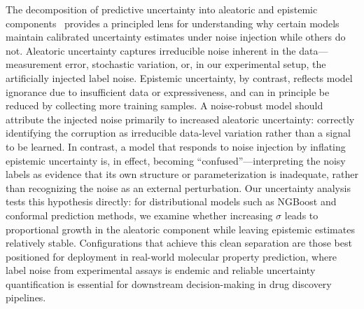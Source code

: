 The decomposition of predictive uncertainty into aleatoric and epistemic
components~\citep{kendall2017uncertainties} provides a principled lens for
understanding why certain models maintain calibrated uncertainty estimates under
noise injection while others do not. Aleatoric uncertainty captures irreducible
noise inherent in the data---measurement error, stochastic variation, or, in our
experimental setup, the artificially injected label noise. Epistemic uncertainty,
by contrast, reflects model ignorance due to insufficient data or
expressiveness, and can in principle be reduced by collecting more training
samples. A noise-robust model should attribute the injected noise primarily to
increased aleatoric uncertainty: correctly identifying the corruption as
irreducible data-level variation rather than a signal to be learned. In
contrast, a model that responds to noise injection by inflating epistemic
uncertainty is, in effect, becoming ``confused''---interpreting the noisy
labels as evidence that its own structure or parameterization is inadequate,
rather than recognizing the noise as an external perturbation. Our uncertainty
analysis tests this hypothesis directly: for distributional models such as
NGBoost and conformal prediction methods, we examine whether increasing
$\sigma$ leads to proportional growth in the aleatoric component while leaving
epistemic estimates relatively stable. Configurations that achieve this clean
separation are those best positioned for deployment in real-world molecular
property prediction, where label noise from experimental assays is endemic and
reliable uncertainty quantification is essential for downstream decision-making
in drug discovery pipelines.
